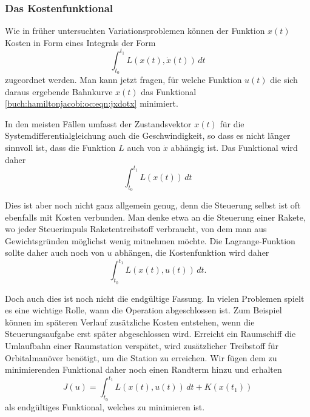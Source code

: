 %
%
\subsubsection{Das Kostenfunktional}
Wie in früher untersuchten Variationsproblemen können der Funktion $x(t)$
Kosten in Form eines Integrals der Form
\begin{equation}
\int_{t_0}^{t_1}
L(x(t),\dot{x}(t))
\,dt
\label{buch:hamiltonjacobi:oc:eqn:jxdotx}
\end{equation}
zugeordnet werden.
Man kann jetzt fragen, für welche Funktion $u(t)$ die sich daraus
ergebende Bahnkurve $x(t)$ das Funktional
\eqref{buch:hamiltonjacobi:oc:eqn:jxdotx}
minimiert.

In den meisten Fällen umfasst der Zustandsvektor $x(t)$ für die
Systemdifferentialgleichung auch die Geschwindigkeit, so dass
es nicht länger sinnvoll ist, dass die Funktion $L$ auch von
$\dot{x}$ abhängig ist.
Das Funktional wird daher
\begin{equation}
\int_{t_0}^{t_1}
L(x(t))
\,dt
\label{buch:hamiltonjacobi:oc:eqn:jx}
\end{equation}

Dies ist aber noch nicht ganz allgemein genug, denn die Steuerung selbst
ist oft ebenfalls mit Kosten verbunden.
Man denke etwa an die Steuerung einer Rakete, wo jeder Steuerimpuls 
Raketentreibstoff verbraucht, von dem man aus Gewichtsgründen möglichst
wenig mitnehmen möchte.
Die Lagrange-Funktion sollte daher auch noch von $u$ abhängen, die
Kostenfunktion wird daher
\begin{equation}
\int_{t_0}^{t_1}
L(x(t),u(t))
\,dt.
\end{equation}

Doch auch dies ist noch nicht die endgültige Fassung.
In vielen Problemen spielt es eine wichtige Rolle, wann die
Operation abgeschlossen ist.
Zum Beispiel können im späteren Verlauf zusätzliche Kosten entstehen,
wenn die Steuerungsaufgabe erst später abgeschlossen wird.
Erreicht ein Raumschiff die Umlaufbahn einer Raumstation verspätet,
wird zusätzlicher Treibstoff für Orbitalmanöver benötigt, um die Station
zu erreichen.
Wir fügen dem zu minimierenden Funktional daher noch einen Randterm
hinzu und erhalten
\begin{equation}
J(u)
=
\int_{t_0}^{t_1}
L(x(t),u(t))
\,dt
+
K(x(t_1))
\label{buch:hamiltonjacobi:oc:eqn:jk}
\end{equation}
als endgültiges Funktional, welches zu minimieren ist.

%
%

